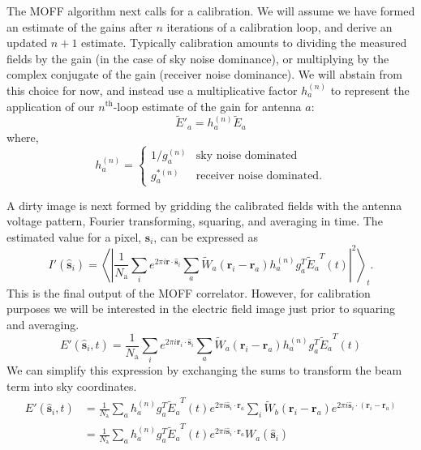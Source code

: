 \documentclass[a4paper,fleqn,usenatbib]{../mnras}
\newcommand{\Nant}{\ensuremath{N_{\mathrm{a}}}}
\newcommand{\s}{\ensuremath{\hat{\mathbf{s}}}} %
\newcommand{\ri}{\ensuremath{\mathbf{r}_i}}
\newcommand{\ra}{\ensuremath{\mathbf{r}_a}}
\newcommand{\beamr}{\ensuremath{\widetilde{W}}}
\newcommand{\beamtheta}{\ensuremath{W}}
\newcommand{\Er}[1]{\ensuremath{\widetilde{E}_{#1}}}
\newcommand{\Erest}[1]{\ensuremath{\widetilde{E}'_{#1}}}
\newcommand{\Ethetaest}{\ensuremath{E'}}
\begin{document}
The MOFF algorithm next calls for a calibration. We will assume we have formed an estimate of the gains after $n$ iterations of a calibration loop, and derive an updated $n+1$ estimate. Typically calibration amounts to dividing the measured fields by the gain (in the case of sky noise dominance), or multiplying by the complex conjugate of the gain (receiver noise dominance). We will abstain from this choice for now, and instead use a multiplicative factor $h^{(n)}_a$ to represent the application of our $n^{\mathrm{th}}$-loop estimate of the gain for antenna $a$:
\begin{equation}
\Erest{a} = h^{(n)}_a \Er{a}
\end{equation}
where,
\begin{equation}
h^{(n)}_a=\begin{cases}
1/g^{(n)}_a & \mbox{sky noise dominated} \\ 
g^{*(n)}_a & \mbox{receiver noise dominated}.
\end{cases}
\end{equation}

A dirty image is next formed by gridding the calibrated fields with the antenna voltage pattern, Fourier transforming, squaring, and averaging in time. The estimated value for a pixel, $\s_i$, can be expressed as
\begin{equation}
I'(\s_i) = \left<\left| \frac{1}{\Nant}\sum_i e^{2\pi i \mathbf{r}\cdot \s_i} \sum_a \beamr_a(\ri - \ra) h^{(n)}_a g^T_a \Er{a}^T(t) \right|^2 \right>_t.
\end{equation}
This is the final output of the MOFF correlator. However, for calibration purposes we will be interested in the electric field image just prior to squaring and averaging.
\begin{equation}
\Ethetaest (\s_i,t) = \frac{1}{\Nant} \sum_i e^{2\pi i \ri \cdot \s_i} \sum_a \beamr_a(\ri - \ra) h^{(n)}_a g^T_a \Er{a}^T(t)
\end{equation}
We can simplify this expression by exchanging the sums to transform the beam term into sky coordinates.
\begin{align}\label{eq:epix}
\Ethetaest(\s_i,t) & = \frac{1}{\Nant} \sum_a h^{(n)}_a g^T_a\Er{a}^T(t) e^{2\pi i \s_i \cdot \ra}\sum_i \beamr_b(\ri-\ra)e^{2\pi i \s_i \cdot (\ri-\ra)} \nonumber\\
& = \frac{1}{\Nant} \sum_a h^{(n)}_a g^T_a\Er{a}^T(t) e^{2\pi i \s_i \cdot \ra}\beamtheta_a(\s_i)
\end{align}
\end{document}
